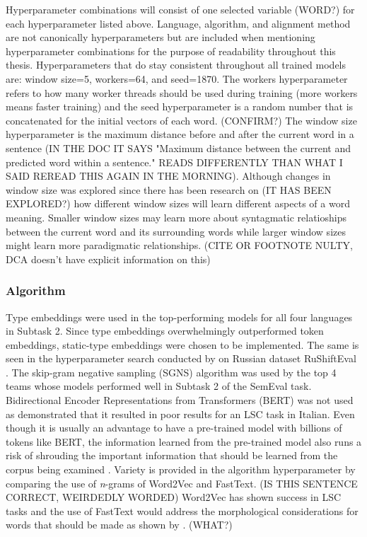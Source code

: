 Hyperparameter combinations will consist of one selected variable (WORD?) for each hyperparameter listed above. Language, algorithm, and alignment method are not canonically hyperparameters but are included when mentioning hyperparameter combinations for the purpose of readability throughout this thesis. Hyperparameters that do stay consistent throughout all trained models are: window size=5, workers=64, and seed=1870. The workers hyperparameter refers to how many worker threads should be used during training (more workers means faster training) and the seed hyperparameter is a random number that is concatenated for the initial vectors of each word. (CONFIRM?) The window size hyperparameter is the maximum distance before and after the current word in a sentence (IN THE DOC IT SAYS "Maximum distance between the current and predicted word within a sentence." READS DIFFERENTLY THAN WHAT I SAID REREAD THIS AGAIN IN THE MORNING). Although changes in window size was explored since there has been research on (IT HAS BEEN EXPLORED?) how different window sizes will learn different aspects of a word meaning. Smaller window sizes may learn more about syntagmatic relatioships between the current word and its surrounding words while larger window sizes might learn more paradigmatic relationships. (CITE OR FOOTNOTE NULTY, DCA doesn't have explicit information on this)


\subsubsection{Algorithm}

Type embeddings were used in the top-performing models for all four languages in Subtask 2.  Since type embeddings overwhelmingly outperformed token embeddings, static-type embeddings were chosen to be implemented. The same is seen in the hyperparameter search conducted by \citet{hengchen2021SBXrushifteval} on Russian dataset RuShiftEval \citep{rushifteval2021}. The skip-gram negative sampling (SGNS) algorithm was used by the top 4 teams whose models performed well in Subtask 2 of the SemEval task. Bidirectional Encoder Representations from Transformers (BERT) was not used as \citet{laicher-2020} demonstrated that it resulted in poor results for an LSC task in Italian. Even though it is usually an advantage to have a pre-trained model with billions of tokens like BERT, the information learned from the pre-trained model also runs a risk of shrouding the important information that should be learned from the corpus being examined \citep{hengchen2021challenges}. Variety is provided in the algorithm hyperparameter by comparing the use of \emph{n}-grams of Word2Vec and FastText. (IS THIS SENTENCE CORRECT, WEIRDEDLY WORDED) Word2Vec has shown success in LSC tasks and the use of FastText would address the morphological considerations for words that should be made as shown by \citet{bojanowski2017enriching}. (WHAT?)


